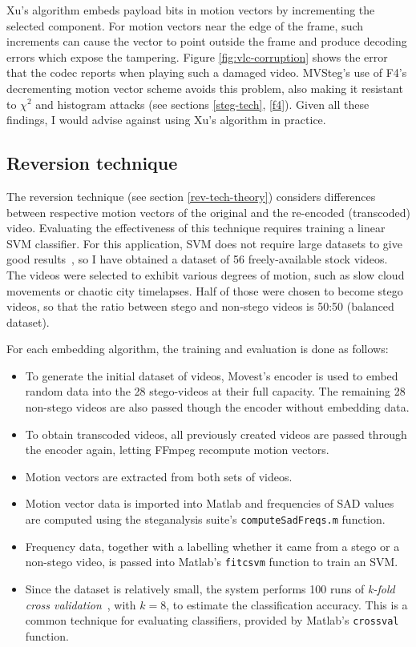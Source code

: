\documentclass[12pt,british,twoside,notitlepage,usenames,dvipsnames,hypens,final]{report}
\numberwithin{equation}{section}
\numberwithin{figure}{section}
\begin{document}
Xu's algorithm embeds payload bits in motion vectors by incrementing the selected component. For motion vectors near the edge of the frame, such increments can cause the vector to point outside the frame and produce decoding errors which expose the tampering. Figure \ref{fig:vlc-corruption} shows the error that the codec reports when playing such a damaged video. MVSteg's use of F4's decrementing motion vector scheme avoids this problem, also making it resistant to $\chi^2$ and histogram attacks (see sections \ref{steg-tech}, \ref{f4}). Given all these findings, I would advise against using Xu's algorithm in practice.

\subsection{Reversion technique}
\label{rev-tech}

The reversion technique (see section \ref{rev-tech-theory}) considers differences between respective motion vectors of the original and the re-encoded (transcoded) video. Evaluating the effectiveness of this technique requires training a linear SVM classifier. For this application, SVM does not require large datasets to give good results~\cite{cao2012video}, so I have obtained a dataset of 56 freely-available stock videos. The videos were selected to exhibit various degrees of motion, such as slow cloud movements or chaotic city timelapses. Half of those were chosen to become stego videos, so that the ratio between stego and non-stego videos is 50:50 (balanced dataset).

For each embedding algorithm, the training and evaluation is done as follows:
\begin{itemize}
\item To generate the initial dataset of videos, Movest's encoder is used to embed random data into the 28 stego-videos at their full capacity. The remaining 28 non-stego videos are also passed though the encoder without embedding data.
\item To obtain transcoded videos, all previously created videos are passed through the encoder again, letting FFmpeg recompute motion vectors.
\item Motion vectors are extracted from both sets of videos.
\item Motion vector data is imported into Matlab and frequencies of SAD values are computed using the steganalysis suite's \texttt{computeSadFreqs.m} function.
\item Frequency data, together with a labelling whether it came from a stego or a non-stego video, is passed into Matlab's \texttt{fitcsvm} function to train an SVM.
\item Since the dataset is relatively small, the system performs 100 runs of \emph{k-fold cross validation}~\cite{ai2-notes}, with $k = 8$, to estimate the classification accuracy. This is a common technique for evaluating classifiers, provided by Matlab's \texttt{crossval} function.

\end{itemize}
\end{document}
